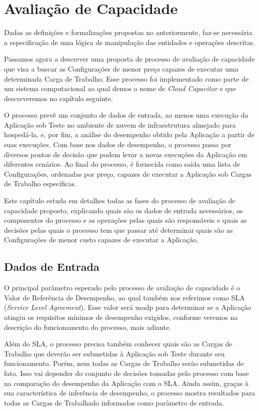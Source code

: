 \chapter[Avaliação de Capacidade]{Avaliação de Capacidade}
Dadas as definições e formalizações propostas no anteriormente, faz-se necessária
a especificação de uma lógica de manipulação das entidades e operações descritas.

Passamos agora a descrever uma proposta de processo de avaliação de capacidade
que visa a buscar as Configurações de menor preço capazes de executar uma determinada 
Carga de Trabalho. Esse processo foi implementado como parte de um sistema 
computacional ao qual demos o nome de \emph{Cloud Capacitor} e que descreveremos 
no capítulo seguinte.  

O processo prevê um conjunto de dados de entrada, ao menos uma execução da 
Aplicação sob Teste no ambiente de nuvem de infraestrutura almejado para 
hospedá-la, e, por fim, a análise do desempenho obtido pela Aplicação a partir 
de suas execuções. Com base nos dados de desempenho, o processo passa por diversos
pontos de decisão que podem levar a novas execuções da Aplicação em diferentes 
cenários. Ao final do processo, é fornecida como saída uma lista de Configurações, 
ordenadas por preço, capazes de executar a Aplicação sob Cargas de Trabalho específicas.

Este capítulo estuda em detalhes todas as fases do processo de avaliação de capacidade
proposto, explicando quais são os dados de entrada necessários, os componentes do 
processo e as operações pelas quais são responsáveis e quais as decisões pelas quais
o processo tem que passar até determinar quais são as Configurações de menor custo
capazes de executar a Aplicação.

\section{Dados de Entrada}

O principal parâmetro esperado pelo processo de avaliação de capacidade é o Valor
de Referência de Desempenho, ao qual também nos referimos como SLA 
(\emph{Service Level Agreement}). Esse valor será usadp para determinar 
se a Aplicação atingiu os requisitos mínimos de desempenho exigidos, conforme
veremos na descrição do funcionamento do processo, mais adiante.

Além do SLA, o processo precisa também conhecer quais são as Cargas de Trabalho
que deverão ser submetidas à Aplicação sob Teste durante seu funcionamento. Porém,
nem todas as Cargas de Trabalho serão submetidas de fato. Isso vai depender do 
conjunto de decisões tomadas pelo processo com base na comparação do desempenho 
da Aplicação com o SLA. Ainda assim, graças à sua característica de inferência de
desempenho, o processo mostra resultados para todas as Cargas de Trabalhado 
informadas como parâmetro de entrada.

